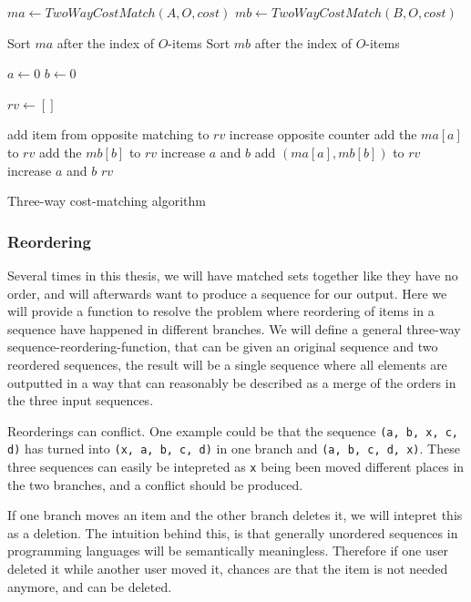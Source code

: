 \documentclass[11pt]{article}
\begin{document}
\begin{algorithm}
\begin{algorithmic}
	\State $ma\gets TwoWayCostMatch(A, O, cost)$
	\State $mb\gets TwoWayCostMatch(B, O, cost)$
	
	\State Sort $ma$ after the index of $O$-items
	\State Sort $mb$ after the index of $O$-items

	\State $a \gets 0$
	\State $b \gets 0$
	
	\State $rv \gets []$
	
			\State add item from opposite matching to $rv$
			\State increase opposite counter
			\State add the $ma[a]$ to $rv$
			\State add the $mb[b]$ to $rv$
			\State increase $a$ and $b$
		\Else
			\State add $(ma[a], mb[b])$ to $rv$
			\State increase $a$ and $b$
		\EndIf
	\EndWhile
	\State \Return $rv$
\EndFunction
\end{algorithmic}
\caption{Three-way cost-matching algorithm}
  \label{ThreeWayCostMatchingAlgorithm}
\end{algorithm}

\subsubsection{Reordering}
\label{ThreeWayReorderingAlgorithmSec}
Several times in this thesis, we will have matched sets together like they have no order, and will afterwards want to produce a sequence for our output. Here we will provide a function to resolve the problem where reordering of items in a sequence have happened in different branches. We will define a general three-way sequence-reordering-function, that can be given an original sequence and two reordered sequences, the result will be a single sequence where all elements are outputted in a way that can reasonably be described as a merge of the orders in the three input sequences.

Reorderings can conflict. One example could be that the sequence \texttt{(a, b, x, c, d)} has turned into \texttt{(x, a, b, c, d)} in one branch and \texttt{(a, b, c, d, x)}. These three sequences can easily be intepreted as \texttt{x} being been moved different places in the two branches, and a conflict should be produced.

If one branch moves an item and the other branch deletes it, we will intepret this as a deletion. The intuition behind this, is that generally unordered sequences in programming languages will be semantically meaningless. Therefore if one user deleted it while another user moved it, chances are that the item is not needed anymore, and can be deleted.
\end{document}
